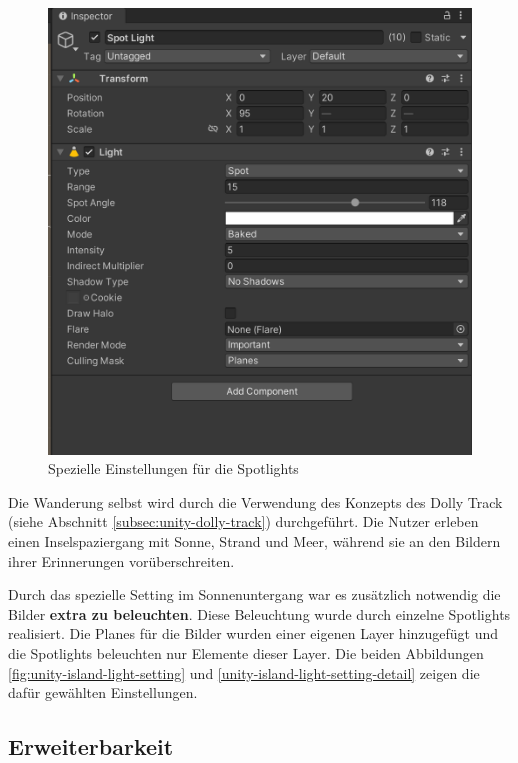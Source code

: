 \begin{figure}
    \vspace{1cm}

    \centering
    \includegraphics[scale=0.15]{pics/unity-island-light-setting-detail.png}
    \caption{Spezielle Einstellungen für die Spotlights}
    \label{fig:unity-island-light-setting-detail}
\end{figure}



Die Wanderung selbst wird durch die Verwendung des Konzepts des Dolly Track (siehe Abschnitt \ref{subsec:unity-dolly-track}) durchgeführt. Die Nutzer erleben einen Inselspaziergang mit Sonne, Strand und Meer, während sie an den Bildern ihrer Erinnerungen vorüberschreiten.



Durch das spezielle Setting im Sonnenuntergang war es zusätzlich notwendig die Bilder \textbf{extra zu beleuchten}. Diese Beleuchtung wurde durch einzelne Spotlights realisiert. Die Planes für die Bilder wurden einer eigenen Layer hinzugefügt und die Spotlights beleuchten nur Elemente dieser Layer. Die beiden Abbildungen \ref{fig:unity-island-light-setting} und \ref{unity-island-light-setting-detail} zeigen die dafür gewählten Einstellungen.


\subsection{Erweiterbarkeit}
\label{subsec:unity-erweiterbarkeit}

